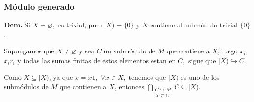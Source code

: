 \documentclass[notes=show]{beamer}%
\begin{document}
\bigskip%
\begin{frame}%


\bigskip%
\frametitle{Módulo generado}%


\bigskip\textbf{Dem. }Si $X=\varnothing,$ es trivial, pues $|X)=\{0\}$ y $X$
contiene al submódulo trivial $\{0\}$.

Supongamos que $X\neq\varnothing$ y sea $C$ un submódulo de $M$ que
contiene a $X$, luego $x_{i},$ $x_{i}r_{i}$ y todas las sumas finitas de estos
elementos estan en $C,$ sigue que $|X)\hookrightarrow C$.

Como $X\subseteq|X)$, ya que $x=x1,$ $\forall x\in X,$ tenemos que $|X)$ es
uno de los submódulos de $M$ que contienen a $X$, entonces $%
{\displaystyle\bigcap\limits_{\substack{C\hookrightarrow M\\X\subseteq C}}}
C\subseteq|X)$.

\bigskip

\bigskip%

\transboxout
\end{frame}%


\bigskip

%
\end{document}
